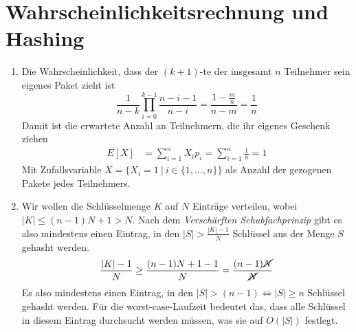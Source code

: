 \documentclass[a4paper,10pt]{article}
\begin{document}
\section{Wahrscheinlichkeitsrechnung und Hashing}
\begin{enumerate}
\item   Die Wahrscheinlichkeit, dass der $(k+1)$-te der insgesamt $n$ Teilnehmer sein eigenes Paket zieht ist
        \[
            \frac{1}{n-k} \prod\limits_{i=0}^{k-1} \frac{n-i-1}{n-i} = \frac{1-\frac{m}{n}}{n-m} = \frac{1}{n}
        \]
        Damit ist die erwartete Anzahl an Teilnehmern, die ihr eigenes Geschenk ziehen
        \begin{align*}
            E[X] &= \sum\limits_{i = 1}^{n} X_i p_i = \sum\limits_{i = 1}^{n} \frac{1}{n} = 1
        \end{align*}
        Mit Zufallsvariable $X = \{X_i = 1\ |\ i \in \{1, ..., n\}\}$ als Anzahl der gezogenen Pakete jedes Teilnehmers.
\item   Wir wollen die Schlüsselmenge $K$ auf $N$ Einträge verteilen, wobei $|K| \leq (n-1)N + 1 > N$. 
        Nach dem \emph{Verschärften Schubfachprinzip} gibt es also mindestens einen Eintrag, in den $|S| > \frac{|K| - 1}{N}$ Schlüssel aus der Menge $S$ gehasht werden.
        \begin{align*}
            \frac{|K| - 1}{N} &\geq \frac{(n-1)N+1-1}{N} = \frac{(n-1)\cancel{N}}{\cancel{N}} \\
        \end{align*}
        Es also mindestens einen Eintrag, in den $|S| > (n-1) \Leftrightarrow |S| \geq n$ Schlüssel gehasht werden. Für die worst-case-Laufzeit bedeutet das, dass alle Schlüssel in diesem Eintrag durchsucht werden müssen, was sie auf $O(|S|)$ festlegt.
\end{enumerate}
\end{document}
